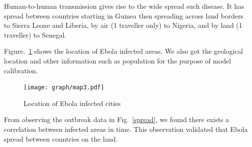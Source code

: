 \documentclass[12pt]{article}
\begin{document}
Human-to-human transmission gives rise to the wide spread such disease. It has spread between countries starting in Guinea then spreading across land borders to Sierra Leone and Liberia, by air (1 traveller only) to Nigeria, and by land (1 traveller) to Senegal.

Figure.~\ref{cities} shows the location of Ebola infected areas. We also got the geological location and other information such as population for the purpose of model calibration.

\begin{figure}[hbt]
\begin{center}
  \texttt{[image: graph/map3.pdf]}
  \caption{Location of Ebola infected cities}
  \label{cities}
\end{center}  
\end{figure}

From observing the outbreak data in Fig.~\ref{spread}, we found there exists a correlation  between infected areas in time. This observation validated that Ebola spread between countries on the land.
\end{document}
